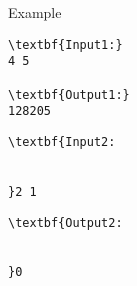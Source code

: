 Example
\begin{verbatim}
\textbf{Input1:}
4 5

\textbf{Output1:}
128205\end{verbatim}
\begin{verbatim}
\textbf{Input2:


}2 1\end{verbatim}
\begin{verbatim}
\textbf{Output2:


}0\end{verbatim}
